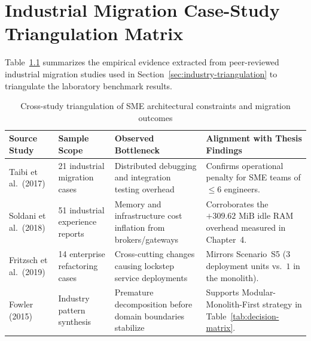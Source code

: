 \chapter{Industrial Migration Case-Study Triangulation Matrix}
\label{app:interviews}

Table~\ref{tab:interview-summary} summarizes the empirical evidence extracted from peer-reviewed industrial migration studies used in Section~\ref{sec:industry-triangulation} to triangulate the laboratory benchmark results.

\begin{table}[h]
  \caption{Cross-study triangulation of SME architectural constraints and migration outcomes}
  \label{tab:interview-summary}
  \centering
  \begin{tabular}{p{3.0cm}p{2.6cm}p{3.4cm}p{4.8cm}}
    \toprule
    \textbf{Source Study} & \textbf{Sample Scope} & \textbf{Observed Bottleneck} & \textbf{Alignment with Thesis Findings} \\
    \midrule
    Taibi et al.\ (2017) \cite{taibi2017} & 21 industrial migration cases & Distributed debugging and integration testing overhead & Confirms operational penalty for SME teams of $\le 6$ engineers. \\
    Soldani et al.\ (2018) \cite{soldani2018} & 51 industrial experience reports & Memory and infrastructure cost inflation from brokers/gateways & Corroborates the $+309.62\text{ MiB}$ idle RAM overhead measured in Chapter~4. \\
    Fritzsch et al.\ (2019) \cite{fritzsch2019} & 14 enterprise refactoring cases & Cross-cutting changes causing lockstep service deployments & Mirrors Scenario~S5 ($3$ deployment units vs.\ $1$ in the monolith). \\
    Fowler (2015) \cite{fowler2015monolith} & Industry pattern synthesis & Premature decomposition before domain boundaries stabilize & Supports Modular-Monolith-First strategy in Table~\ref{tab:decision-matrix}. \\
    \bottomrule
  \end{tabular}
\end{table}
